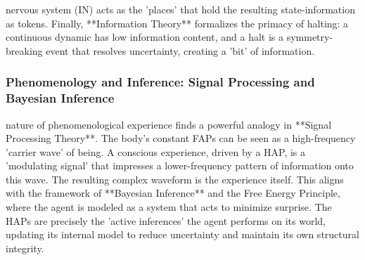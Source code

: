 nervous system (IN) acts as the 'places' that hold the resulting state-information as tokens. Finally, **Information Theory** formalizes the primacy of halting: a continuous dynamic has low information content, and a halt is a symmetry-breaking event that resolves uncertainty, creating a 'bit' of information.\n\n\subsubsection*{Phenomenology and Inference: Signal Processing and Bayesian Inference}\nThe nature of phenomenological experience finds a powerful analogy in **Signal Processing Theory**. The body's constant FAPs can be seen as a high-frequency 'carrier wave' of being. A conscious experience, driven by a HAP, is a 'modulating signal' that impresses a lower-frequency pattern of information onto this wave. The resulting complex waveform is the experience itself. This aligns with the framework of **Bayesian Inference** and the Free Energy Principle, where the agent is modeled as a system that acts to minimize surprise. The HAPs are precisely the 'active inferences' the agent performs on its world, updating its internal model to reduce uncertainty and maintain its own structural integrity.
